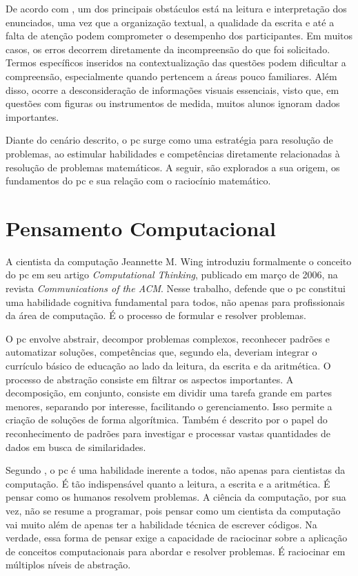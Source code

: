 De acordo com , um dos principais obstáculos está na
leitura e interpretação dos enunciados, uma vez que a organização textual, a
qualidade da escrita e até a falta de atenção podem comprometer o desempenho dos
participantes. Em muitos casos, os erros decorrem diretamente da incompreensão
do que foi solicitado. Termos específicos inseridos na contextualização das
questões podem dificultar a compreensão, especialmente quando pertencem a áreas
pouco familiares. Além disso, ocorre a desconsideração de informações visuais
essenciais, visto que, em questões com figuras ou instrumentos de medida, muitos
alunos ignoram dados importantes.

Diante do cenário descrito, o \gls{pc} surge como uma
estratégia para resolução de problemas, ao estimular habilidades e competências
diretamente relacionadas à resolução de problemas matemáticos. A seguir, são
explorados a sua origem, os fundamentos do \gls{pc} e sua relação com o raciocínio
matemático.

\section{Pensamento Computacional}

A cientista da computação Jeannette M. Wing introduziu formalmente o conceito
do \gls{pc} em seu artigo \textit{Computational Thinking},
publicado em março de 2006, na revista \textit{Communications of the ACM}. Nesse
trabalho,  defende que o \gls{pc} constitui uma habilidade cognitiva
fundamental para todos, não apenas para profissionais da área de computação. É o
processo de formular e resolver problemas.

O \gls{pc} envolve abstrair, decompor problemas complexos, reconhecer padrões e
automatizar soluções, competências que, segundo ela, deveriam integrar o
currículo básico de educação ao lado da leitura, da escrita e da aritmética. O
processo de abstração consiste em filtrar os aspectos importantes. A
decomposição, em conjunto, consiste em dividir uma tarefa grande em partes
menores, separando por interesse, facilitando o gerenciamento. Isso permite
a criação de soluções de forma algorítmica. Também é descrito por
 o papel do reconhecimento de padrões para investigar e processar
vastas quantidades de dados em busca de similaridades.

\newpage{}

Segundo , o \gls{pc} é uma habilidade inerente a todos, não apenas para
cientistas da computação. É tão indispensável quanto a leitura, a escrita e a
aritmética. É pensar como os humanos resolvem problemas. A ciência da
computação, por sua vez, não se resume a programar, pois pensar como um cientista da
computação vai muito além de apenas ter a habilidade técnica de escrever
códigos. Na verdade, essa forma de pensar exige a capacidade de raciocinar sobre
a aplicação de conceitos computacionais para abordar e resolver problemas. É
raciocinar em múltiplos níveis de abstração.


